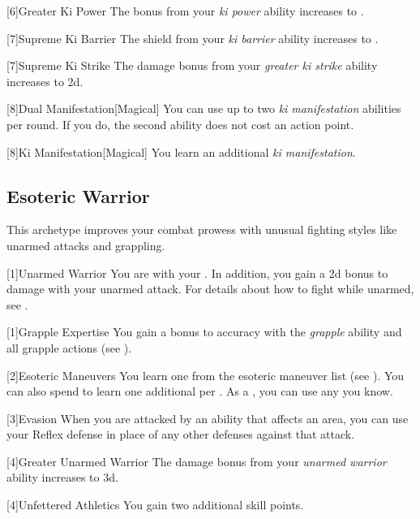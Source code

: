         [6]{Greater Ki Power} The bonus from your \textit{ki power} ability increases to .

        [7]{Supreme Ki Barrier} The shield from your \textit{ki barrier} ability increases to .

        [7]{Supreme Ki Strike} The damage bonus from your \textit{greater ki strike} ability increases to \plus2d.

        [8]{Dual Manifestation}[Magical] You can use up to two \textit{ki manifestation} abilities per round.
        If you do, the second ability does not cost an action point.

        [8]{Ki Manifestation}[Magical]
        You learn an additional \textit{ki manifestation}.

    \subsection{Esoteric Warrior}\label{Esoteric Warrior}
        This archetype improves your combat prowess with unusual fighting styles like unarmed attacks and grappling.

        [1]{Unarmed Warrior}
        You are  with your .
        In addition, you gain a \plus2d bonus to damage with your unarmed attack.
        For details about how to fight while unarmed, see .

        [1]{Grapple Expertise}
        You gain a  bonus to accuracy with the \textit{grapple} ability and all grapple actions (see ).

        [2]{Esoteric Maneuvers} 
        You learn one  from the esoteric maneuver list (see ).
        You can also spend  to learn one additional  per .
        As a , you can use any  you know.

        [3]{Evasion} When you are attacked by an ability that affects an area, you can use your Reflex defense in place of any other defenses against that attack.

        [4]{Greater Unarmed Warrior} The damage bonus from your \textit{unarmed warrior} ability increases to \plus3d.

        [4]{Unfettered Athletics} You gain two additional skill points.

